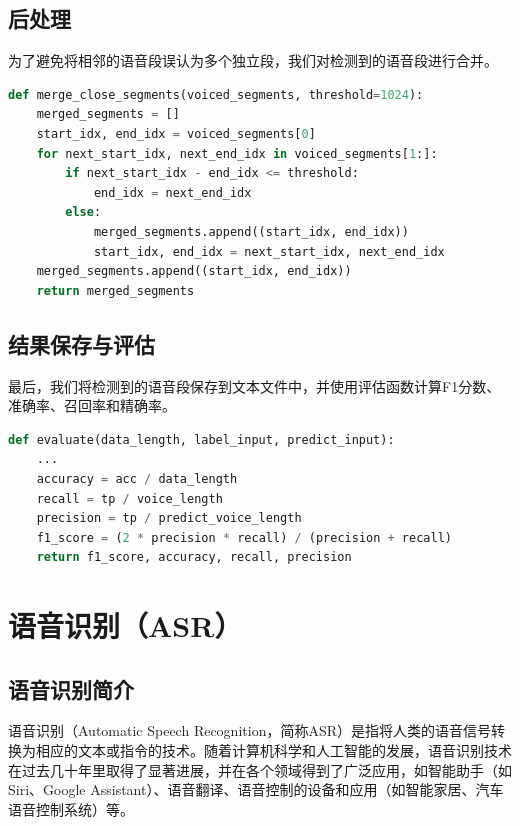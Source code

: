 \documentclass[12pt,hyperref,a4paper,UTF8]{ctexart}
\begin{document}
\subsection*{后处理}

为了避免将相邻的语音段误认为多个独立段，我们对检测到的语音段进行合并。

\begin{lstlisting}[language=Python, caption=合并相邻语音段]
def merge_close_segments(voiced_segments, threshold=1024):
    merged_segments = []
    start_idx, end_idx = voiced_segments[0]
    for next_start_idx, next_end_idx in voiced_segments[1:]:
        if next_start_idx - end_idx <= threshold:
            end_idx = next_end_idx
        else:
            merged_segments.append((start_idx, end_idx))
            start_idx, end_idx = next_start_idx, next_end_idx
    merged_segments.append((start_idx, end_idx))
    return merged_segments
\end{lstlisting}

\subsection*{结果保存与评估}

最后，我们将检测到的语音段保存到文本文件中，并使用评估函数计算F1分数、
准确率、召回率和精确率。

\begin{lstlisting}[language=Python, caption=评估VAD算法性能]
def evaluate(data_length, label_input, predict_input):
    ...
    accuracy = acc / data_length
    recall = tp / voice_length
    precision = tp / predict_voice_length
    f1_score = (2 * precision * recall) / (precision + recall)
    return f1_score, accuracy, recall, precision
\end{lstlisting}

\newpage

\section{语音识别（ASR）}

\subsection{语音识别简介}

语音识别（Automatic Speech Recognition，简称ASR）是指将人类的语音信号转换为相应的文本或指令的技术。随着计算机科学和人工智能的发展，语音识别技术在过去几十年里取得了显著进展，并在各个领域得到了广泛应用，如智能助手（如Siri、Google Assistant）、语音翻译、语音控制的设备和应用（如智能家居、汽车语音控制系统）等。
\end{document}
